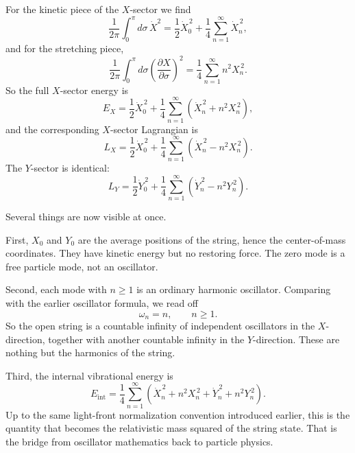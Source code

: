For the kinetic piece of the \(X\)-sector we find
\begin{equation}
\frac{1}{2\pi}\int_0^\pi d\sigma\,\dot X^2
=
\frac{1}{2}\dot X_0^{\,2}
+
\frac{1}{4}\sum_{n=1}^{\infty}\dot X_n^{\,2},
\end{equation}
and for the stretching piece,
\begin{equation}
\frac{1}{2\pi}\int_0^\pi d\sigma
\left(\frac{\partial X}{\partial \sigma}\right)^2
=
\frac{1}{4}\sum_{n=1}^{\infty}n^2X_n^{\,2}.
\end{equation}
So the full \(X\)-sector energy is
\begin{equation}
E_X=
\frac{1}{2}\dot X_0^{\,2}
+
\frac{1}{4}\sum_{n=1}^{\infty}
\left(
\dot X_n^{\,2}+n^2X_n^{\,2}
\right),
\end{equation}
and the corresponding \(X\)-sector Lagrangian is
\begin{equation}
L_X=
\frac{1}{2}\dot X_0^{\,2}
+
\frac{1}{4}\sum_{n=1}^{\infty}
\left(
\dot X_n^{\,2}-n^2X_n^{\,2}
\right).
\end{equation}
The \(Y\)-sector is identical:
\begin{equation}
L_Y=
\frac{1}{2}\dot Y_0^{\,2}
+
\frac{1}{4}\sum_{n=1}^{\infty}
\left(
\dot Y_n^{\,2}-n^2Y_n^{\,2}
\right).
\end{equation}

Several things are now visible at once.

First, \(X_0\) and \(Y_0\) are the average positions of the string, hence the center-of-mass coordinates. They have kinetic energy but no restoring force. The zero mode is a free particle mode, not an oscillator.

Second, each mode with \(n\geq 1\) is an ordinary harmonic oscillator. Comparing with the earlier oscillator formula, we read off
\begin{equation}
\omega_n=n,
\qquad
n\geq 1.
\end{equation}
So the open string is a countable infinity of independent oscillators in the \(X\)-direction, together with another countable infinity in the \(Y\)-direction. These are nothing but the harmonics of the string.

Third, the internal vibrational energy is
\begin{equation}
E_{\mathrm{int}}
=
\frac{1}{4}\sum_{n=1}^{\infty}
\left(
\dot X_n^{\,2}+n^2X_n^{\,2}
+
\dot Y_n^{\,2}+n^2Y_n^{\,2}
\right).
\end{equation}
Up to the same light-front normalization convention introduced earlier, this is the quantity that becomes the relativistic mass squared of the string state. That is the bridge from oscillator mathematics back to particle physics.

